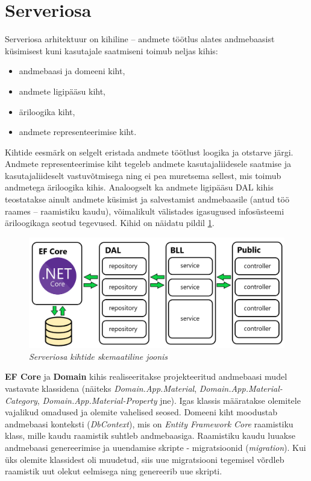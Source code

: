 \section{Serveriosa}
Serveriosa arhitektuur on kihiline -- andmete töötlus alates andmebaasist küsimisest kuni kasutajale saatmiseni toimub neljas kihis:
\begin{itemize}
    \item andmebaasi ja domeeni kiht,
    \item andmete ligipääsu kiht,
    \item äriloogika kiht,
    \item andmete representeerimise kiht.
\end{itemize}
Kihtide eesmärk on selgelt eristada andmete töötlust loogika ja otstarve järgi. Andmete representeerimise kiht tegeleb andmete 
kasutajaliidesele saatmise ja kasutajaliideselt vastuvõtmisega ning ei pea muretsema sellest, mis toimub andmetega äriloogika kihis. 
Analoogselt ka andmete ligipääsu DAL kihis teostatakse ainult andmete küsimist ja salvestamist andmebaasile
(antud töö raames -- raamistiku kaudu), võimalikult välistades igasugused infosüsteemi äriloogikaga seotud tegevused. 
Kihid on näidatu pildil \ref{fig:development_backend_layers}.

\begin{figure}[ht]
    \centering
    \includegraphics[width=1\textwidth]{figures/development/backend_structure.png}
    \caption[Serveriosa kihtide skemaatiline joonis]{\textit{Serveriosa kihtide skemaatiline joonis}}
    \label{fig:development_backend_layers}
\end{figure}
 

\textbf{EF Core} ja \textbf{Domain} kihis realiseeritakse projekteeritud andmebaasi mudel vastavate klassidena (näiteks \textit{Domain.App.Material},
\textit{Domain.App.Material-Category}, \textit{Domain.App.Material-Property} jne). Igas klassis määratakse olemitele vajalikud omadused ja
olemite vahelised seosed. Domeeni kiht moodustab andmebaasi konteksti (\textit{DbContext}), mis on \textit{Entity Framework Core} raamistiku klass,
mille kaudu raamistik suhtleb andmebaasiga. Raamistiku kaudu luuakse andmebaasi genereerimise ja uuendamise skripte - migratsioonid
(\textit{migration}). Kui üks olemite klassidest oli muudetud, siis uue migratsiooni tegemisel 
võrdleb raamistik uut olekut eelmisega ning genereerib uue skripti.


